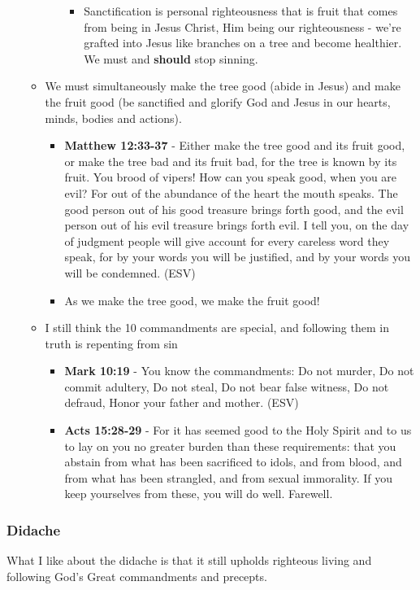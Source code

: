 \documentclass[11pt]{article}
\begin{document}
\begin{itemize}
\begin{itemize}
\begin{itemize}
\begin{itemize}
\item Sanctification is personal righteousness that is fruit that comes from being in Jesus Christ, Him being our righteousness - we're grafted into Jesus like branches on a tree and become healthier. We must and \textbf{should} stop sinning.
\end{itemize}
\end{itemize}
\item We must simultaneously make the tree good (abide in Jesus) and make the fruit good (be sanctified and glorify God and Jesus in our hearts, minds, bodies and actions).
\begin{itemize}
\item \textbf{Matthew 12:33-37} - Either make the tree good and its fruit good, or make the tree bad and its fruit bad, for the tree is known by its fruit. You brood of vipers! How can you speak good, when you are evil? For out of the abundance of the heart the mouth speaks. The good person out of his good treasure brings forth good, and the evil person out of his evil treasure brings forth evil. I tell you, on the day of judgment people will give account for every careless word they speak, for by your words you will be justified, and by your words you will be condemned. (ESV)
\item As we make the tree good, we make the fruit good!
\end{itemize}
\item I still think the 10 commandments are special, and following them in truth is repenting from sin
\begin{itemize}
\item \textbf{Mark 10:19} - You know the commandments: Do not murder, Do not commit adultery, Do not steal, Do not bear false witness, Do not defraud, Honor your father and mother. (ESV)
\item \textbf{Acts 15:28-29} - For it has seemed good to the Holy Spirit and to us to lay on you no greater burden than these requirements: that you abstain from what has been sacrificed to idols, and from blood, and from what has been strangled, and from sexual immorality. If you keep yourselves from these, you will do well. Farewell.
\end{itemize}
\end{itemize}
\end{itemize}

\subsubsection{Didache}
\label{sec:orgc21a199}
What I like about the didache is that it still upholds righteous living and following God's Great commandments and precepts.
\end{document}
